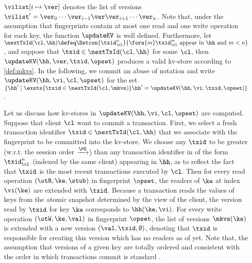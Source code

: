 $\vilist[i \mapsto \ver]$ denotes the list of versions $\vilist' = \ver_0 \cdots \ver_{i-1} \ver \ver_{i+1} \cdots 
\ver_{n}$. 
Note that, under the assumption that fingerprints contain at most one read and one write 
operation for each key, the function $\updateKV$ is well defined. Furthermore, 
let $\nextTxId(\cl, \hh) \defeq
\Setcon{\txid_{\cl}^{n}}{\fora{m} \txid_{\cl}^{m} \text{ appear in } \hh \text{ and } m < n }$, 
and suppose that $\txid \in \nextTxId(\cl, \hh)$ for some $\cl$,
then $\updateKV(\hh, \ver, \txid, \opset)$ produces a valid kv-store according to \cref{def:mkvs}.
In the following, we commit an abuse of notation and write $\updateKV(\hh, \vi, \cl, \opset)$ 
for the set $\{\hh' \mid \exsts { \txid \in \nextTxId(\cl, \mkvs) } \hh' = \updateKV(\hh, \vi, \txid, \opset)\}$.

Let us discuss how kv-stores in $\updateKV(\hh, \vi, \cl, \opset)$ are computed. 
Suppose that client \( \cl \) want to commit a transaction.
First, we select a fresh transaction identifier $\txid \in \nextTxId(\cl, \hh)$ that we associate 
with the fingerprint to be committed into the kv-store. We choose any $\txid$ to be 
greater (w.r.t. the session order $\xrightarrow{\PO}$) than any transaction identifier 
in of the form $\txid_{\cl}^{n}$ (indexed by the same client) appearing in $\hh$,
as to reflect the fact that $\txid$ is the most recent transactions executed by $\cl$.
Then for every read operation $(\otR, \ke, \stub)$ in fingerprint $\opset$,
the readers of $\ke$ at index $\vi(\ke)$ are extended with $\txid$.
Because a transaction reads the values of keys from the atomic 
snapshot determined by the view of the client, \ie the version read by $\txid$ for key $\ke$ 
corresponds to $\hh(\ke, \vi)$.
For every write operation $(\otW, \ke, \val)$ in fingerprint $\opset$, 
the list of versions $\mkvs(\ke)$ is extended with a new version $(\val, \txid, \emptyset)$, 
denoting that $\txid$ is responsible for creating this version which has no readers as of yet. 
Note that, the assumption that versions of 
a given key are totally ordered and consistent with the order in which 
transactions commit is standard \cite{adya,framework-concur,seebelieve}. 

